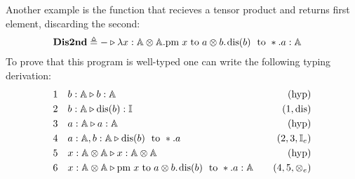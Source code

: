 \begin{example} \label{example:prog_Dis2nd}
Another example is the function that recieves a tensor product and returns first element, discarding the second:
\begin{equation*}
\begin{split}
& \textbf{Dis2nd} \triangleq - \triangleright \lambda x: \mathbb{A \otimes A}. \text{pm} \hspace{3 pt} x \hspace{3 pt} \text{to} \hspace{3 pt} a \otimes b. \hspace{1 pt} \text{dis}(b) \hspace{3 pt} \text{ to } *.a: \mathbb{A}
\end{split}
\end{equation*}
To prove that this program is well-typed one can write the following typing derivation:
\begin{equation*}
\begin{split}
1  \hspace{10 pt} & b : \mathbb{A} \triangleright b : \mathbb{A}  \hspace{10 pt} & {(\text{hyp})} \\
2 \hspace{10 pt} & b : \mathbb{A} \triangleright \text{dis}(b): \mathbb{I} \hspace{10 pt} & {(1,\text{dis})} \\
3 \hspace{10 pt} & a : \mathbb{A} \triangleright a : \mathbb{A}  \hspace{10 pt} & {(\text{hyp})} \\
4 \hspace{10 pt} &  a : \mathbb{A}, b : \mathbb{A}  \triangleright \text{dis}(b) \hspace{3 pt} \text{ to } *.a  & {(2,3,\mathbb{I}_{e})} \\
5 \hspace{10 pt} & x : \mathbb{A \otimes A} \triangleright x : \mathbb{A \otimes A}  \hspace{10 pt} & {(\text{hyp})} \\
6 \hspace{10 pt} & x : \mathbb{A \otimes A} \triangleright \text{pm} \hspace{3 pt} x \hspace{3 pt} \text{to} \hspace{3 pt} a \otimes b. \hspace{1 pt} \text{dis}(b) \hspace{3 pt} \text{ to } *.a : \mathbb{A} \hspace{10pt} & \text{($4,5,\otimes_{e}$)} \\

\end{split}
\end{equation*}
\end{example}
